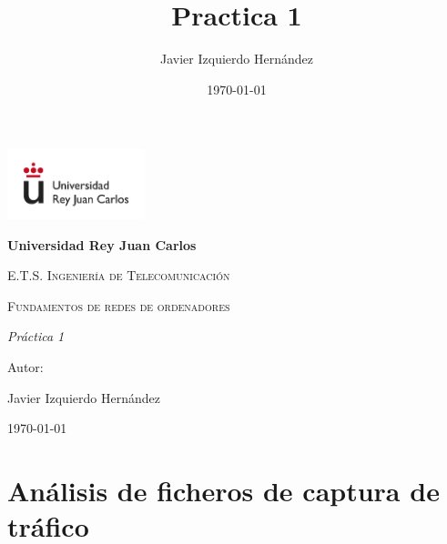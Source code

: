 \documentclass[12pt, a4paper]{report}
\title{Practica 1}
\author{Javier Izquierdo Hernández}
\date{\today}
\begin{document}
	\begin{titlepage}
		\centering
		{\includegraphics[width=0.3\textwidth]{logo}\par}
		\vspace{1cm}
		{\bfseries\LARGE Universidad Rey Juan Carlos \par}
		\vspace{1cm}
		{\scshape\Large E.T.S. Ingeniería de Telecomunicación \par}
		\vspace{3cm}
		{\scshape\Huge Fundamentos de redes de ordenadores \par}
		\vspace{3cm}
		{\itshape\Large Práctica 1 \par}
		\vfill
		{\Large Autor: \par}
		{\Large Javier Izquierdo Hernández \par}
		\vfill
		{\Large \today \par}
	\end{titlepage}

\newpage
\renewcommand{\contentsname}{Contenidos}
\tableofcontents
\newpage

\chapter{Análisis de ficheros de captura de tráfico}
\end{document}

